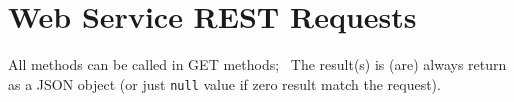 

%

\section{Web Service REST Requests}
\hspace*{\parindent}
All methods can be called in GET methods;~
The result(s) is (are) always return as a JSON object (or just \texttt{null} value if zero result match the request). 

